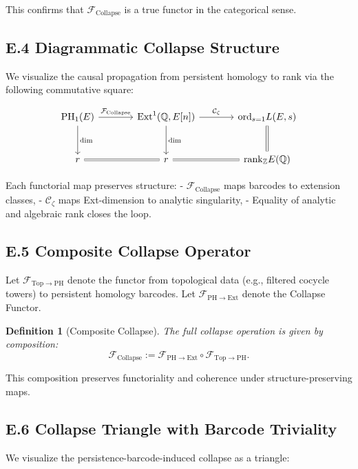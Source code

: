 \documentclass[11pt]{article}
\newtheorem{definition}[theorem]{Definition}
\DeclareMathOperator{\Ext}{Ext}
\DeclareMathOperator{\PH}{PH}
\newcommand{\QQ}{\mathbb{Q}}
\newcommand{\ZZ}{\mathbb{Z}}
\begin{document}
This confirms that $\mathcal{F}_{\mathrm{Collapse}}$ is a true functor in the categorical sense.

\subsection*{E.4 Diagrammatic Collapse Structure}

We visualize the causal propagation from persistent homology to rank via the following commutative square:

\[
\begin{tikzcd}[row sep=large, column sep=large]
\PH_1(E) \arrow[r, "\mathcal{F}_{\mathrm{Collapse}}"] \arrow[d, "\dim"]
& \Ext^1(\QQ,E[n]) \arrow[d, "\dim"] \arrow[r, "\mathcal{C}_\zeta"]
& \mathrm{ord}_{s=1} L(E,s) \arrow[d, equal] \\
r \arrow[r, equal] & r \arrow[r, equal] & \mathrm{rank}_{\ZZ} E(\QQ)
\end{tikzcd}
\]

Each functorial map preserves structure:
- $\mathcal{F}_{\mathrm{Collapse}}$ maps barcodes to extension classes,
- $\mathcal{C}_\zeta$ maps Ext-dimension to analytic singularity,
- Equality of analytic and algebraic rank closes the loop.

\subsection*{E.5 Composite Collapse Operator}

Let $\mathcal{F}_{\mathrm{Top} \to \mathrm{PH}}$ denote the functor from topological data (e.g., filtered cocycle towers) to persistent homology barcodes.  
Let $\mathcal{F}_{\mathrm{PH} \to \mathrm{Ext}}$ denote the Collapse Functor.

\begin{definition}[Composite Collapse]
The full collapse operation is given by composition:
\[
\mathcal{F}_{\mathrm{Collapse}} := \mathcal{F}_{\mathrm{PH} \to \mathrm{Ext}} \circ \mathcal{F}_{\mathrm{Top} \to \mathrm{PH}}.
\]
\end{definition}

This composition preserves functoriality and coherence under structure-preserving maps.

\subsection*{E.6 Collapse Triangle with Barcode Triviality}

We visualize the persistence-barcode-induced collapse as a triangle:
\end{document}
